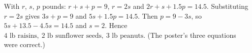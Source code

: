 With $r$, $s$, $p$ pounds: $r+s+p=9$, $r=2s$ and $2r+s+1.5p=14.5$. Substituting $r=2s$ gives $3s+p=9$ and $5s+1.5p=14.5$. Then $p=9-3s$, so $5s+13.5-4.5s=14.5$ and $s=2$. Hence $\boxed{4\text{ lb raisins},\ 2\text{ lb sunflower seeds},\ 3\text{ lb peanuts}}$. (The poster's three equations were correct.)
